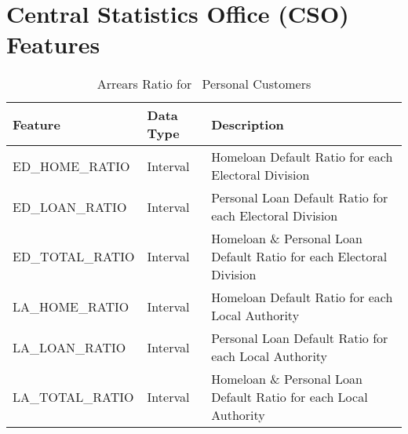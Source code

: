 
\chapter{Central Statistics Office (CSO) Features} %

\label{AppendixE} %




\begin{table}[H]
	\centering
	\resizebox{\textwidth}{!}
	{
		\label{my-label}
		\begin{tabular}{|l|l|l|}
			\hline
			\textbf{Feature} & \textbf{Data Type} & \textbf{Description}                                                                                                                                                                                                                                                                                                                                                                                                                                                                                                                              \\ \hline
			ED\_HOME\_RATIO  & Interval & Homeloan Default Ratio for each Electoral Division \\ \hline
			ED\_LOAN\_RATIO  & Interval & Personal Loan Default Ratio for each Electoral Division \\ \hline
			ED\_TOTAL\_RATIO & Interval & Homeloan \& Personal Loan Default Ratio for each Electoral Division \\ \hline
			LA\_HOME\_RATIO  & Interval & Homeloan Default Ratio for each Local Authority \\ \hline
			LA\_LOAN\_RATIO  & Interval & Personal Loan Default Ratio for each Local Authority \\ \hline
			LA\_TOTAL\_RATIO & Interval & Homeloan \& Personal Loan Default Ratio for each Local Authority \\ \hline
		\end{tabular}
	}
	\caption{Arrears Ratio for \subjectname\ Personal Customers }
\end{table}


